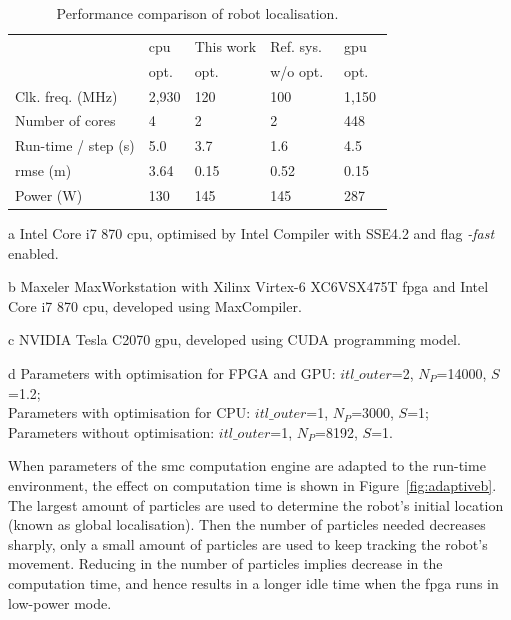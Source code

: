 \begin{table}[ht]
	\setlength{\tabcolsep}{2pt}
	\begin{spacing}{1.0}
	\caption{Performance comparison of robot localisation.}
	\label{tab:perf_mcl1}
	\centering
	\smallskip
	\begin{threeparttable}
		\begin{tabular}{l|x{3cm}y{3cm}x{3cm}x{3cm}}
			\hline
															& \gls{cpu} 							& This work  				& Ref. sys.~\cite{chau14trets}  	& \gls{gpu} \\
															& opt.~		&	opt.~		& w/o opt.~		& opt. ~ \\
			\hline
			\hline
			Clk. freq. (MHz) 	& 2,930 & 120 	& 100 	& 1,150 \\
			Number of cores					& 4		& 2 	& 2 	& 448 \\
			\hline
			\hline
			Run-time / step (s) 	& 5.0	& 3.7	& 1.6			& 4.5 \\
			\gls{rmse} (m)								& 3.64	& 0.15	& 0.52	& 0.15 \\
			Power (W)								& 130		& 145 	& 145		& 287 \\
			\hline
		\end{tabular}
		\begin{tablenotes}
		\item[a] Intel Core i7 870 \gls{cpu}, optimised by Intel Compiler with SSE4.2 and flag {\it -fast} enabled.
		\item[b] Maxeler MaxWorkstation with Xilinx Virtex-6 XC6VSX475T \gls{fpga} and Intel Core i7 870 \gls{cpu}, developed using MaxCompiler.
		\item[c] NVIDIA Tesla C2070 \gls{gpu}, developed using CUDA programming model.
		\item[d] Parameters with optimisation for FPGA and GPU: $itl\_outer$=2, $N_P$=14000, $S$=1.2; \\ Parameters with optimisation for CPU: $itl\_outer$=1, $N_P$=3000, $S$=1; \\ Parameters without optimisation: $itl\_outer$=1, $N_P$=8192, $S$=1. 
		\end{tablenotes}
	\end{threeparttable}
	\end{spacing}
\end{table}

When parameters of the \gls{smc} computation engine are adapted to the run-time environment, the effect on computation time is shown in Figure~\ref{fig:adaptiveb}.
The largest amount of particles are used to determine the robot's initial location (known as global localisation).
Then the number of particles needed decreases sharply, only a small amount of particles are used to keep tracking the robot's movement.
Reducing in the number of particles implies decrease in the computation time, and hence results in a longer idle time when the \gls{fpga} runs in low-power mode.

